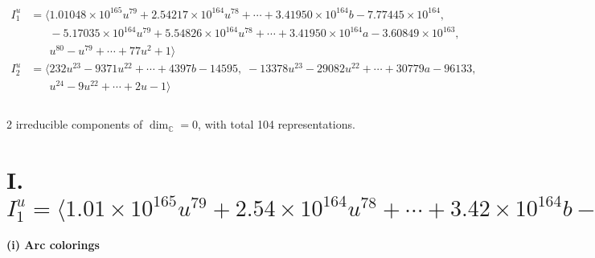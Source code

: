 \documentclass[1p]{elsarticle_modified}
\theoremstyle{definition}
\begin{document}
\begin{align*}
I^u_{1}&=\langle 
1.01048\times10^{165} u^{79}+2.54217\times10^{164} u^{78}+\cdots+3.41950\times10^{164} b-7.77445\times10^{164},\\
\phantom{I^u_{1}}&\phantom{= \langle  }-5.17035\times10^{164} u^{79}+5.54826\times10^{164} u^{78}+\cdots+3.41950\times10^{164} a-3.60849\times10^{163},\\
\phantom{I^u_{1}}&\phantom{= \langle  }u^{80}- u^{79}+\cdots+77 u^2+1\rangle \\
I^u_{2}&=\langle 
232 u^{23}-9371 u^{22}+\cdots+4397 b-14595,\;-13378 u^{23}-29082 u^{22}+\cdots+30779 a-96133,\\
\phantom{I^u_{2}}&\phantom{= \langle  }u^{24}-9 u^{22}+\cdots+2 u-1\rangle \\
\\
\end{align*}
\raggedright * 2 irreducible components of $\dim_{\mathbb{C}}=0$, with total 104 representations.\\
\newpage
\renewcommand{\arraystretch}{1}
\centering \section*{I. $I^u_{1}= \langle 1.01\times10^{165} u^{79}+2.54\times10^{164} u^{78}+\cdots+3.42\times10^{164} b-7.77\times10^{164},\;-5.17\times10^{164} u^{79}+5.55\times10^{164} u^{78}+\cdots+3.42\times10^{164} a-3.61\times10^{163},\;u^{80}- u^{79}+\cdots+77 u^2+1 \rangle$}
\flushleft \textbf{(i) Arc colorings}\\
\end{document}
